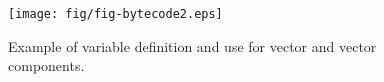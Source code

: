 \begin{figure}[!ht]
\begin{center}
\texttt{[image: fig/fig-bytecode2.eps]}
\caption{Example of variable definition and use for vector and
vector components.}\label{fig-bytecode2}
\end{center}
\end{figure}


\begin{comment}
01 public class VetClone {
02     static Integer cp[];
03
04     Integer[] copy( Integer[] or )
05     {
06         if ( or != null ) {
07             cp = new Integer[or.length];
08             for( int i = 0; i < or.length; i++ )
09             {
10                 cp[i] = new Integer( or[i].intValue() );
11                 print( cp[i] );
12             }
13         }
14         return cp;
15     }
16     public void print( Object obj )
17     {
18         System.out.print( obj.toString() );
19     }
20 }

0:    aload_1
1:    ifnull        #53
4:    aload_1
5:    arraylength
6:    anewarray     <java.lang.Integer>
9:    putstatic     VetClone.cp
12:   iconst_0
13:   istore_2
14:   goto          #47
17:   getstatic     VetClone.cp
20:   iload_2
21:   new           <java.lang.Integer>
24:   dup
25:   aload_1
26:   iload_2
27:   aaload
28:   invokevirtual java.lang.Integer.intValue
31:   invokespecial java.lang.Integer.<init>
34:   aastore
35:   aload_0
36:   getstatic     VetClone.cp
39:   iload_2
40:   aaload
41:   invokevirtual VetClone.print
44:   iinc          %
47:   iload_2
48:   aload_1
49:   arraylength
50:   if_icmplt     #17
53:   getstatic     VetClone.cp
56:   areturn
\end{comment}
